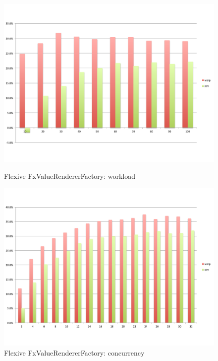 \begin{figure}
\begin{minipage}{0.45 \textwidth}
		\includegraphics[width=\textwidth]{../../eval/32threads/case3it.pdf}
			\caption{\label{Fi:case3it}Flexive {\sf FxValueRendererFactory}: workload}
	\end{minipage}
		\hspace{0.1 \textwidth}
	\begin{minipage}{0.45 \textwidth}
		\includegraphics[width=\textwidth]{../../eval/32threads/case3th.pdf}
			\caption{\label{Fi:case3th}Flexive {\sf FxValueRendererFactory}: concurrency}
	\end{minipage}
	\begin{minipage}{0.45 \textwidth}

\end{minipage}
\end{figure}
